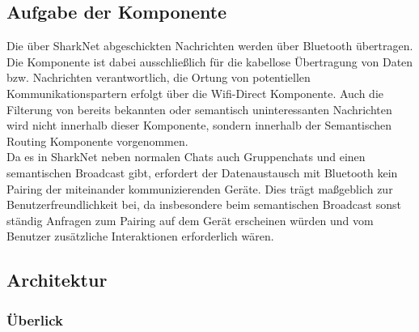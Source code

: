 

\subsection{Aufgabe der Komponente}
Die über SharkNet abgeschickten Nachrichten werden über Bluetooth übertragen. Die Komponente ist dabei ausschließlich für die kabellose Übertragung von Daten bzw. Nachrichten verantwortlich, die Ortung von potentiellen Kommunikationspartern erfolgt über die Wifi-Direct Komponente. Auch die Filterung von bereits bekannten oder semantisch uninteressanten Nachrichten wird nicht innerhalb dieser Komponente, sondern innerhalb der Semantischen Routing Komponente vorgenommen.
\\Da es in SharkNet neben normalen Chats auch Gruppenchats und einen semantischen Broadcast gibt, erfordert der Datenaustausch mit Bluetooth kein Pairing der miteinander kommunizierenden Geräte. Dies trägt maßgeblich zur Benutzerfreundlichkeit bei, da insbesondere beim semantischen Broadcast sonst ständig Anfragen zum Pairing auf dem Gerät erscheinen würden und vom Benutzer zusätzliche Interaktionen erforderlich wären.



\subsection{Architektur}

\subsubsection{Überlick}\label{ch:bluetoothoverview}

